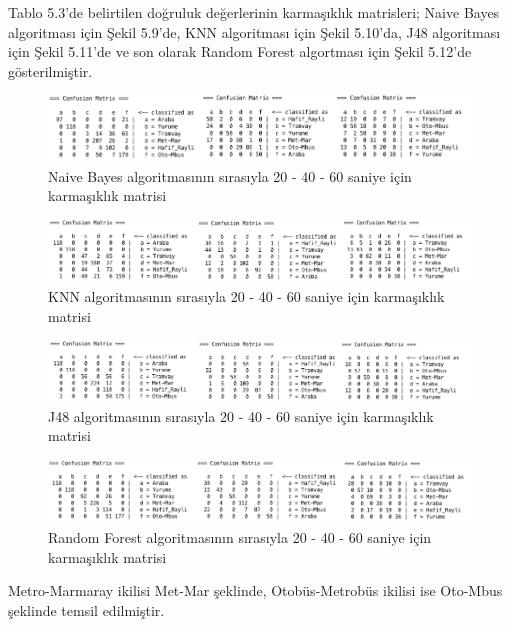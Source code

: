 Tablo 5.3'de belirtilen doğruluk değerlerinin karmaşıklık matrisleri; Naive Bayes algoritması için Şekil 5.9'de, KNN algoritması için Şekil 5.10'da, J48 algoritması için Şekil 5.11'de ve son olarak Random Forest algortması için Şekil 5.12'de gösterilmiştir.

\begin{figure}[!h]
\centering
\includegraphics[width=\textwidth]{projectChapters/images/NB_2_2.png}
\caption{Naive Bayes algoritmasının sırasıyla 20 - 40 - 60 saniye için karmaşıklık matrisi}
\end{figure}

\begin{figure}[!h]
\centering
\includegraphics[width=\textwidth]{projectChapters/images/KNN_2_2.png}
\caption{KNN algoritmasının sırasıyla 20 - 40 - 60 saniye için karmaşıklık matrisi}
\end{figure}

\begin{figure}[!h]
\centering
\includegraphics[width=\textwidth]{projectChapters/images/J48_2_2.png}
\caption{J48 algoritmasının sırasıyla 20 - 40 - 60 saniye için karmaşıklık matrisi}
\end{figure}

\begin{figure}[!h]
\centering
\includegraphics[width=\textwidth]{projectChapters/images/RF_2_2.png}
\caption{Random Forest algoritmasının sırasıyla 20 - 40 - 60 saniye için karmaşıklık matrisi}
\end{figure}
Metro-Marmaray ikilisi Met-Mar şeklinde, Otobüs-Metrobüs ikilisi ise Oto-Mbus şeklinde temsil edilmiştir.

